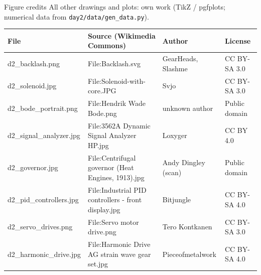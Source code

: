 \documentclass[aspectratio=169,10pt]{beamer}
\begin{document}
\begin{frame}{Figure credits}
\fontsize{7}{8.5}\selectfont
All other drawings and plots: own work (TikZ / pgfplots; numerical data from \texttt{day2/data/gen\_data.py}).\\[2mm]
\begin{tabularx}{\textwidth}{@{}lXll@{}}
\toprule
File & Source (Wikimedia Commons) & Author & License\\
\midrule
d2\_backlash.png & File:Backlash.svg & GearHeads, Slashme & CC BY-SA 3.0\\
d2\_solenoid.jpg & File:Solenoid-with-core.JPG & Svjo & CC BY-SA 3.0\\
d2\_bode\_portrait.png & File:Hendrik Wade Bode.png & unknown author & Public domain\\
d2\_signal\_analyzer.jpg & File:3562A Dynamic Signal Analyzer HP.jpg & Loxyger & CC BY 4.0\\
d2\_governor.jpg & File:Centrifugal governor (Heat Engines, 1913).jpg & Andy Dingley (scan) & Public domain\\
d2\_pid\_controllers.jpg & File:Industrial PID controllers - front display.jpg & Bitjungle & CC BY-SA 4.0\\
d2\_servo\_drives.png & File:Servo motor drive.png & Tero Kontkanen & CC BY-SA 3.0\\
d2\_harmonic\_drive.jpg & File:Harmonic Drive AG strain wave gear set.jpg & Pieceofmetalwork & CC BY-SA 4.0\\
\bottomrule
\end{tabularx}
\end{frame}
\end{document}

